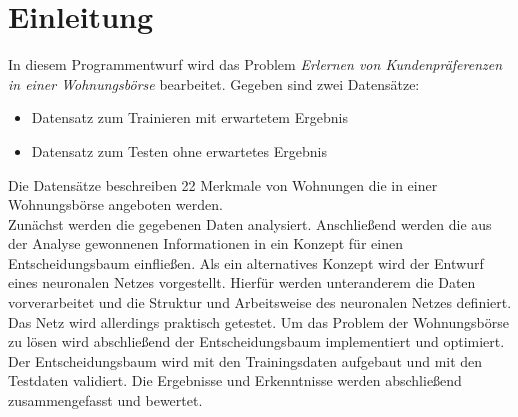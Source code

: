 \section{Einleitung}\label{sec:einleitung}
In diesem Programmentwurf wird das Problem \emph{Erlernen von Kundenpräferenzen in einer Wohnungsbörse}
bearbeitet. Gegeben sind zwei Datensätze: 
\begin{itemize}
    \item Datensatz zum Trainieren mit erwartetem Ergebnis
    \item Datensatz zum Testen ohne erwartetes Ergebnis
\end{itemize}

Die Datensätze beschreiben 22 Merkmale von Wohnungen die in einer Wohnungsbörse angeboten werden. \\
Zunächst werden die gegebenen Daten analysiert. Anschließend werden die aus der Analyse gewonnenen Informationen 
in ein Konzept für einen Entscheidungsbaum einfließen. 
Als ein alternatives Konzept wird der Entwurf eines neuronalen Netzes vorgestellt. Hierfür werden unteranderem
die Daten vorverarbeitet und die Struktur und Arbeitsweise des neuronalen Netzes definiert. Das Netz wird allerdings praktisch getestet. 
Um das Problem der Wohnungsbörse zu lösen wird abschließend der Entscheidungsbaum implementiert und optimiert. 
Der Entscheidungsbaum wird mit den Trainingsdaten aufgebaut und mit den Testdaten validiert.
Die Ergebnisse und Erkenntnisse werden abschließend zusammengefasst und bewertet.